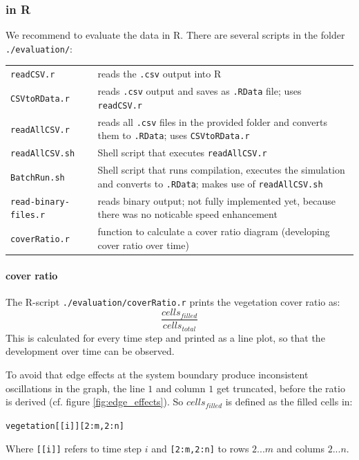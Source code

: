 \subsubsection{\label{sec:R}in R }

We recommend to evaluate the data in R. There are several scripts in the folder \texttt{./evaluation/}:

\begin{tabulary}{\textwidth}{lL}
\texttt{readCSV.r} & reads the \texttt{.csv} output into R \\
\texttt{CSVtoRData.r} & reads \texttt{.csv} output and saves as \texttt{.RData} file; uses \texttt{readCSV.r} \\
\texttt{readAllCSV.r} & reads all \texttt{.csv} files in the provided folder and converts them to \texttt{.RData}; uses \texttt{CSVtoRData.r} \\
\texttt{readAllCSV.sh} & Shell script that executes \texttt{readAllCSV.r} \\
\texttt{BatchRun.sh} & Shell script that runs compilation, executes the simulation and converts to \texttt{.RData}; makes use of \texttt{readAllCSV.sh} \\
\texttt{read-binary-files.r} & reads binary output; not fully implemented yet, because there was no noticable speed enhancement \\
\texttt{coverRatio.r} & function to calculate a cover ratio diagram (developing cover ratio over time) \\


\end{tabulary}

\paragraph{cover ratio}

The R-script \texttt{./evaluation/coverRatio.r} prints the vegetation cover ratio as:
\[
\frac{cells_{filled}}{cells_{total}}
\]
This is calculated for every time step and printed as a line plot, so that the development over time can be observed.

To avoid that edge effects at the system boundary  produce inconsistent oscillations in the graph, the line $1$ and column $1$ get truncated, before the ratio is derived (cf. figure \ref{fig:edge_effects}). So $cells_{filled}$ is defined as the filled cells in:

\texttt{vegetation[[i]][2:m,2:n]}

Where \texttt{[[i]]} refers to time step $i$ and \texttt{[2:m,2:n]} to rows $2...m$ and colums $2...n$.

